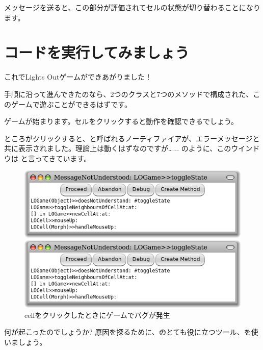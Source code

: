 \documentclass[a4paper,10pt,twoside]{book}
\begin{document}

\noindent
{}メッセージを送ると、この部分が評価されてセルの状態が切り替わることになります。

\section{コードを実行してみましょう}

これでLights Outゲームができあがりました！

手順に沿って進んできたのなら、2つのクラスと7つのメソッドで構成された、このゲームで遊ぶことができるはずです。


ゲームが始まります。セルをクリックすると動作を確認できるでしょう。

ところがクリックすると、と呼ばれるノーティファイアが、エラーメッセージと共に表示されました。理論上は動くはずなのですが\ldots{}... のように、このウインドウは と言ってきています。

\begin{figure}[ht]
\ifluluelse
	{\centerline{\includegraphics[width=\textwidth]{Error}}}
	{\centerline{\includegraphics[scale=0.7]{Error}}}
\caption{cellをクリックしたときにゲームでバグが発生
}
\end{figure}

\noindent
何が起こったのでしょうか? 原因を探るために、\st のとても役に立つツール、を使いましょう。
\end{document}
